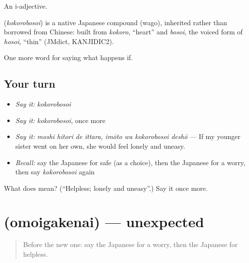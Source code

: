 An i-adjective.

\begin{cousinweb}
\textbf{} (\emph{kokorobosoi}) is a native Japanese compound (wago), inherited rather than borrowed from Chinese: built from \emph{kokoro}, \textquotedblleft{}heart\textquotedblright{} and \emph{bosoi}, the voiced form of \emph{hosoi}, \textquotedblleft{}thin\textquotedblright{} (JMdict, KANJIDIC2).
\end{cousinweb}

\begin{grammarlens}[title={What you've built}]
One more word for saying what happens if.
\end{grammarlens}

\subsection*{Your turn}
\begin{itemize}
\raggedright
  \item \emph{Say it:} \emph{kokorobosoi}
  \item \emph{Say it:} \emph{kokorobosoi}, once more
  \item \emph{Say it:} \emph{moshi hitori de ittara, imōto wa kokorobosoi deshō} — If my younger sister went on her own, she would feel lonely and uneasy.
  \item \emph{Recall:} say the Japanese for safe (as a choice), then the Japanese for a worry, then say \emph{kokorobosoi} again
\end{itemize}

\begin{tcolorbox}[breakable,colback=teal!4,colframe=teal!35!black,title={Before you move on}]
What does  mean? (\textquotedblleft{}Helpless; lonely and uneasy\textquotedblright{}.) Say it once more.
\end{tcolorbox}
\section[\texorpdfstring{\ja{おもいがけない} (omoigakenai)}{おもいがけない (omoigakenai)}]{ (omoigakenai) — unexpected}

\label{lesson:JA-C520-omoigakenai}



\begin{quote}
Before the new one: say the Japanese for a worry, then the Japanese for helpless.
\end{quote}

